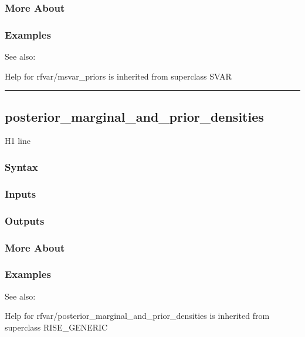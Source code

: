 \documentclass[letterpaper,10pt,english]{sphinxmanual}
\begin{document}
\subsubsection{More About}
\label{classes/models/@rfvar/rfvar:id74}

\subsubsection{Examples}
\label{classes/models/@rfvar/rfvar:id75}
See also:

Help for rfvar/msvar\_priors is inherited from superclass SVAR


\bigskip\hrule{}\bigskip



\subsection{posterior\_marginal\_and\_prior\_densities}
\label{classes/models/@rfvar/rfvar:id76}\label{classes/models/@rfvar/rfvar:posterior-marginal-and-prior-densities}
H1 line


\subsubsection{Syntax}
\label{classes/models/@rfvar/rfvar:id77}

\subsubsection{Inputs}
\label{classes/models/@rfvar/rfvar:id78}

\subsubsection{Outputs}
\label{classes/models/@rfvar/rfvar:id79}

\subsubsection{More About}
\label{classes/models/@rfvar/rfvar:id80}

\subsubsection{Examples}
\label{classes/models/@rfvar/rfvar:id81}
See also:

Help for rfvar/posterior\_marginal\_and\_prior\_densities is inherited from superclass RISE\_GENERIC
\end{document}

